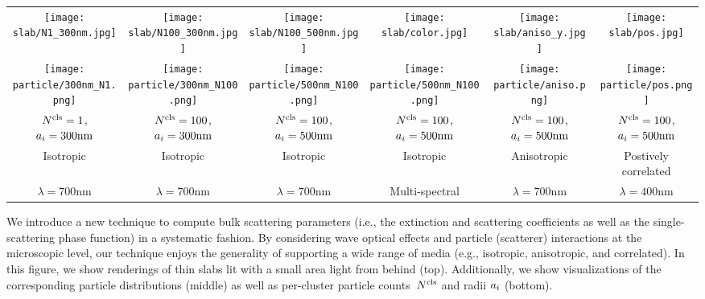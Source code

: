 \begin{teaserfigure}
    \centering
    \setlength{\resLen}{1.12in}
    \addtolength{\tabcolsep}{-3.5pt}
    \small
    \begin{tabular}{cccccc}
        \texttt{[image: slab/N1\_300nm.jpg]} &
        \texttt{[image: slab/N100\_300nm.jpg]} &
        \texttt{[image: slab/N100\_500nm.jpg]} &
        \texttt{[image: slab/color.jpg]} & 
        \texttt{[image: slab/aniso\_y.jpg]} &
        \texttt{[image: slab/pos.jpg]}
        \\
        \texttt{[image: particle/300nm\_N1.png]} &
        \texttt{[image: particle/300nm\_N100.png]} &
        \texttt{[image: particle/500nm\_N100.png]} &
        \texttt{[image: particle/500nm\_N100.png]} &
        \texttt{[image: particle/aniso.png]} &
        \texttt{[image: particle/pos.png]}
        \\[-1em]
        ${N^\text{cls}}=1$, $a_i=300\text{nm}$ &
        ${N^\text{cls}}=100$, $a_i=300\text{nm}$ &
        ${N^\text{cls}}=100$, $a_i=500\text{nm}$ &
        ${N^\text{cls}}=100$, $a_i=500\text{nm}$ & 
        ${N^\text{cls}}=100$, $a_i=500\text{nm}$ &
        ${N^\text{cls}}=100$, $a_i=500\text{nm}$
        \\
        Isotropic & Isotropic & Isotropic & Isotropic & Anisotropic & Postively correlated
        \\
        $\lambda=700\text{nm}$ &
        $\lambda=700\text{nm}$ &
        $\lambda=700\text{nm}$ &
        Multi-spectral &
        $\lambda=700\text{nm}$ &
        $\lambda=400\text{nm}$
    \end{tabular}
    \caption{\label{fig:teaser}
        We introduce a new technique to compute bulk scattering parameters (i.e., the extinction and scattering coefficients as well as the single-scattering phase function) in a systematic fashion. By considering wave optical effects and particle (scatterer) interactions at the microscopic level, our technique enjoys the generality of supporting a wide range of media (e.g., isotropic, anisotropic, and correlated).
        In this figure, we show renderings of thin slabs lit with a small area light from behind (top).
        Additionally, we show visualizations of the corresponding particle distributions (middle) as well as per-cluster particle counts~${N^\text{cls}}$ and radii $a_i$ (bottom).
    }
\end{teaserfigure}
